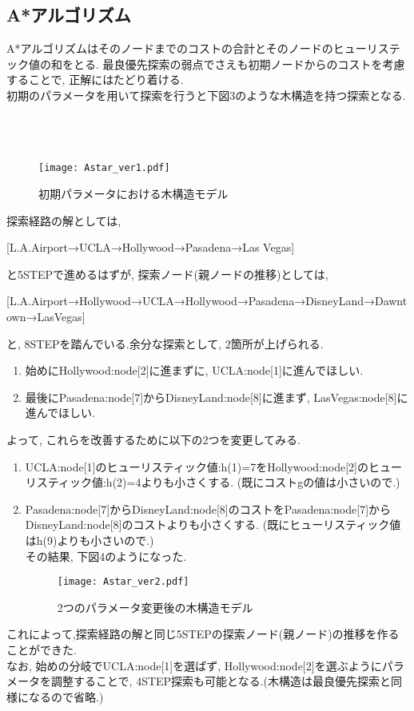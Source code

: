 \documentclass[uplatex,12pt]{jsarticle}
\begin{document}
\subsection{A*アルゴリズム}
A*アルゴリズムはそのノードまでのコストの合計とそのノードのヒューリステック値の和をとる. 最良優先探索の弱点でさえも初期ノードからのコストを考慮することで, 正解にはたどり着ける.\\

初期のパラメータを用いて探索を行うと下図3のような木構造を持つ探索となる.\\\\\\\\
\begin{figure}[htbp]
 \begin{center}
  \texttt{[image: Astar\_ver1.pdf]}
 \end{center}
 \caption[]{初期パラメータにおける木構造モデル}\label{fig:fig1.3}
\end{figure}

探索経路の解としては,
\begin{center}
[L.A.Airport→UCLA→Hollywood→Pasadena→Las Vegas]
\end{center}
と5STEPで進めるはずが, 探索ノード(親ノードの推移)としては,
\begin{center}
[L.A.Airport→Hollywood→UCLA→Hollywood→Pasadena→DisneyLand→Dawntown→LasVegas]
\end{center}
と, 8STEPを踏んでいる.余分な探索として, 2箇所が上げられる.
\begin{enumerate}
 \item 始めにHollywood:node[2]に進まずに, UCLA:node[1]に進んでほしい.
 \item 最後にPasadena:node[7]からDisneyLand:node[8]に進まず, LasVegas:node[8]に進んでほしい.
\end{enumerate}

よって, これらを改善するために以下の2つを変更してみる.
\begin{enumerate}
 \item UCLA:node[1]のヒューリスティック値:h(1)=7をHollywood:node[2]のヒューリスティック値:h(2)=4よりも小さくする. (既にコストgの値は小さいので.)
 \item Pasadena:node[7]からDisneyLand:node[8]のコストをPasadena:node[7]からDisneyLand:node[8]のコストよりも小さくする. (既にヒューリスティック値はh(9)よりも小さいので.)\\
その結果, 下図4のようになった.
\begin{figure}[htbp]
 \begin{center}
  \texttt{[image: Astar\_ver2.pdf]}
 \end{center}
 \caption[]{2つのパラメータ変更後の木構造モデル}\label{fig:fig1.3}
\end{figure}
\end{enumerate}
これによって,探索経路の解と同じ5STEPの探索ノード(親ノード)の推移を作ることができた.\\
なお, 始めの分岐でUCLA:node[1]を選ばず, Hollywood:node[2]を選ぶようにパラメータを調整することで, 4STEP探索も可能となる.(木構造は最良優先探索と同様になるので省略.)
\end{document}
